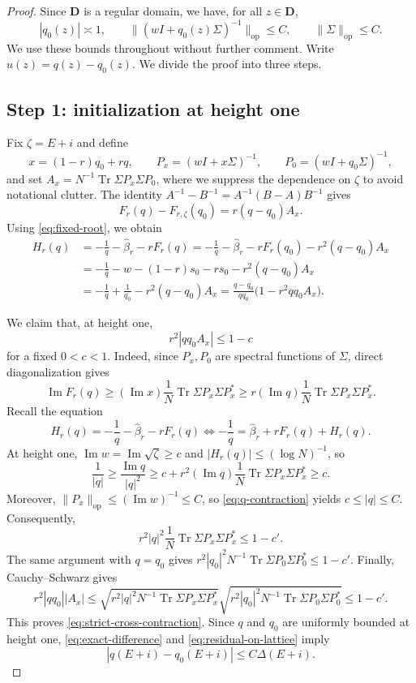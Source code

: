 \documentclass[11pt,reqno]{amsart}
\def\bD{\mathbf{D}}
\def\Im{\operatorname{Im}}
\def\op{\mathrm{op}}
\def\Tr{\operatorname{Tr}}
\theoremstyle{definition}
\numberwithin{equation}{section}
\numberwithin{figure}{section}
\begin{document}
\begin{proof}
Since $\bD$ is a regular domain, we have, for all $z\in\bD$,
\begin{equation}\label{eq:regular-bounds}
 |q_0(z)|\asymp1,\qquad
 \|(wI+q_0(z)\Sigma)^{-1}\|_{\op}\le C,\qquad
 \|\Sigma\|_{\op}\le C.
\end{equation}
We use these bounds throughout without further comment. Write $u(z)=q(z)-q_0(z)$. We divide the proof into three steps.

\subsection*{Step 1: initialization at height one}
Fix $\zeta=E+i$ and define
\[
 x=(1-r)q_0+rq,\qquad
 P_x=(wI+x\Sigma)^{-1},\qquad
 P_0=(wI+q_0\Sigma)^{-1},
\]
and set $A_x=N^{-1}\Tr\Sigma P_x\Sigma P_0$, where we suppress the dependence on $\zeta$ to avoid notational clutter. The identity $A^{-1}-B^{-1}=A^{-1}(B-A)B^{-1}$ gives
\[
 F_{r}(q)-F_{r,\zeta}(q_0)=r(q-q_0)A_x.
\]
Using \eqref{eq:fixed-root}, we obtain
\begin{align}\label{eq:exact-difference}
 H_r(q)&=-\frac{1}{q}-\hat\beta_r-rF_r(q)=-\frac{1}{q}-\hat\beta_r-rF_r(q_0)-r^2(q-q_0)A_x\\
 &=-\frac{1}{q}-w-(1-r)s_0-rs_0-r^2(q-q_0)A_x\\
 &=-\frac{1}{q}+\frac{1}{q_0}-r^2(q-q_0)A_x
 =\frac{q-q_0}{qq_0}
   \bigl(1-r^2qq_0 A_x\bigr).
\end{align}

We claim that, at height one,
\begin{equation}\label{eq:strict-cross-contraction}
 r^2|qq_0 A_x|\le 1-c
\end{equation}
for a fixed $0<c<1$. Indeed, since $P_x,P_0$ are spectral functions of $\Sigma$, direct diagonalization gives
\begin{equation}\label{eq:imaginary-Fr}
 \Im F_r(q)
 \ge(\Im x)\frac1N\Tr\Sigma P_x\Sigma P_x^*
 \ge r(\Im q)\frac1N\Tr\Sigma P_x\Sigma P_x^*.
\end{equation}
Recall the equation
\begin{equation}\label{eq:q-contraction}
 H_r(q)=-\frac{1}{q}-\hat\beta_r-rF_r(q)\iff -\frac{1}{q}=\hat\beta_r+rF_r(q)+H_r(q).
\end{equation}
At height one, $\Im w=\Im\sqrt{\zeta}\ge c$ and $|H_r(q)|\le(\log N)^{-1}$, so
\[
    \frac{1}{|q|}\geq\frac{\Im q}{|q|^2}
 \ge c+r^2(\Im q)\frac1N\Tr\Sigma P_x\Sigma P_x^*\geq c.
\]
Moreover, $\|P_x\|_{\op}\le(\Im w)^{-1}\le C$, so
\eqref{eq:q-contraction} yields $c\le|q|\le C$. Consequently,
\[
 r^2|q|^2\frac1N\Tr\Sigma P_x\Sigma P_x^*\le1-c'.
\]
The same argument with $q=q_0$ gives
$r^2|q_0|^2N^{-1}\Tr\Sigma P_0\Sigma P_0^*\le1-c'$. Finally, Cauchy--Schwarz gives
\[
    r^2|qq_0||A_x|\leq \sqrt{r^2|q|^2N^{-1}\Tr\Sigma P_x\Sigma P_x^*}\sqrt{r^2|q_0|^2N^{-1}\Tr\Sigma P_0\Sigma P_0^*}\leq 1-c'.
\]
This proves \eqref{eq:strict-cross-contraction}. Since $q$ and $q_0$ are uniformly
bounded at height one, \eqref{eq:exact-difference} and
\eqref{eq:residual-on-lattice} imply
\begin{equation}\label{eq:top-anchor}
 |q(E+i)-q_0(E+i)|\le C\Delta(E+i).
\end{equation}


\end{proof}
\end{document}
